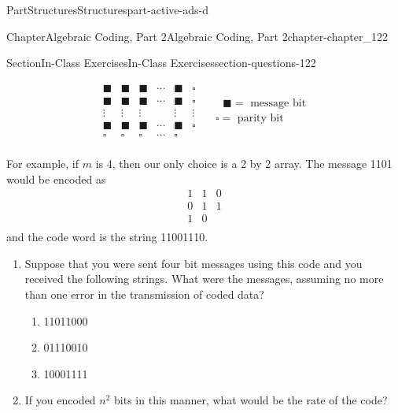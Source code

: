 \documentclass[oneside,10pt,]{book}
\numberwithin{equation}{section}
\begin{document}
\begin{partptx}{Part}{Structures}{}{Structures}{}{}{part-active-ads-d}
\begin{chapterptx}{Chapter}{Algebraic Coding, Part 2}{}{Algebraic Coding, Part 2}{}{}{chapter-chapter_122}
\begin{sectionptx}{Section}{In-Class Exercises}{}{In-Class Exercises}{}{}{section-questions-122}
\begin{enumerate}[label=\arabic*.]
\begin{equation*}
\begin{array}{cccccc}
\blacksquare  & \blacksquare  & \blacksquare  & \cdots  & \blacksquare  & \square  \\
\blacksquare  & \blacksquare  & \blacksquare  & \cdots  & \blacksquare  & \square  \\
\vdots  & \vdots  & \vdots  &   & \vdots  & \vdots  \\
\blacksquare  & \blacksquare  & \blacksquare  & \cdots  & \blacksquare  & \square  \\
\square  & \square  & \square  & \cdots  & \square  &   \\
\end{array}  \quad \begin{array}{c}
\textrm{      }\blacksquare  = \textrm{ message} \textrm{ bit} \\
\square  =\textrm{ parity} \textrm{ bit} \\
\end{array}
\end{equation*}
%
\par
For example, if \(m\) is 4, then our only choice is a 2 by 2 array.  The message 1101 would be encoded as%
\begin{equation*}
\begin{array}{cc|c}
1 & 1 & 0\\
0 & 1 & 1\\
\hline
1 & 0 &\\
\end{array}
\end{equation*}
and the code word is the string 11001110.%
\par
%
\begin{enumerate}[label=(\alph*)]
\item{}Suppose that you were sent four bit messages using this code and you received the following strings.  What were the messages, assuming no more than one error in the transmission of coded data?%
\begin{multicols}{3}
\begin{enumerate}[label=(\roman*)]
\item{}11011000%
\item{}01110010%
\item{}10001111%
\end{enumerate}
\end{multicols}
%
\item{}If you encoded \(n^2\) bits in this manner, what would be the rate of the code?%

\end{enumerate}
\end{enumerate}
\end{sectionptx}
\end{chapterptx}
\end{partptx}
\end{document}
